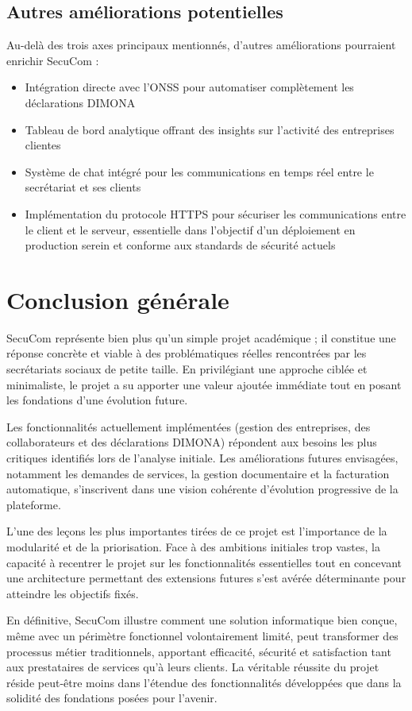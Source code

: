 \subsection*{Autres améliorations potentielles}

Au-delà des trois axes principaux mentionnés, d'autres améliorations pourraient enrichir SecuCom :

\begin{itemize}
  \item Intégration directe avec l'ONSS pour automatiser complètement les déclarations DIMONA
  \item Tableau de bord analytique offrant des insights sur l'activité des entreprises clientes
  \item Système de chat intégré pour les communications en temps réel entre le secrétariat et ses clients
  \item Implémentation du protocole HTTPS pour sécuriser les communications entre le client et le serveur, essentielle dans l'objectif d'un déploiement en production serein et conforme aux standards de sécurité actuels
\end{itemize}

\section*{Conclusion générale}

SecuCom représente bien plus qu'un simple projet académique ; il constitue une réponse concrète et viable à des problématiques réelles rencontrées par les secrétariats sociaux de petite taille. En privilégiant une approche ciblée et minimaliste, le projet a su apporter une valeur ajoutée immédiate tout en posant les fondations d'une évolution future.

Les fonctionnalités actuellement implémentées (gestion des entreprises, des collaborateurs et des déclarations DIMONA) répondent aux besoins les plus critiques identifiés lors de l'analyse initiale. Les améliorations futures envisagées, notamment les demandes de services, la gestion documentaire et la facturation automatique, s'inscrivent dans une vision cohérente d'évolution progressive de la plateforme.

L'une des leçons les plus importantes tirées de ce projet est l'importance de la modularité et de la priorisation. Face à des ambitions initiales trop vastes, la capacité à recentrer le projet sur les fonctionnalités essentielles tout en concevant une architecture permettant des extensions futures s'est avérée déterminante pour atteindre les objectifs fixés.

En définitive, SecuCom illustre comment une solution informatique bien conçue, même avec un périmètre fonctionnel volontairement limité, peut transformer des processus métier traditionnels, apportant efficacité, sécurité et satisfaction tant aux prestataires de services qu'à leurs clients. La véritable réussite du projet réside peut-être moins dans l'étendue des fonctionnalités développées que dans la solidité des fondations posées pour l'avenir.
